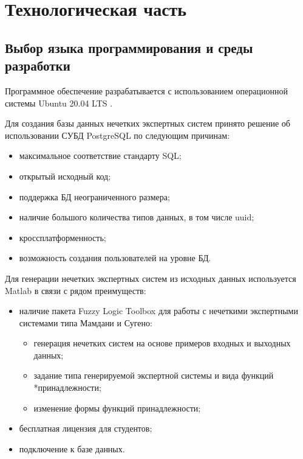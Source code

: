 
\section{Технологическая часть}

\subsection{Выбор языка программирования и среды разработки}
Программное обеспечение разрабатывается с использованием операционной системы Ubuntu 20.04 LTS \cite{ubuntu}.

Для создания базы данных нечетких экспертных систем принято решение об использовании СУБД PostgreSQL \cite{Postgres} по следующим причинам:
\begin{itemize}
	\item максимальное соответствие стандарту SQL;
	\item открытый исходный код;
	\item поддержка БД неограниченного размера;
	\item наличие большого количества типов данных, в том числе uuid;
	\item кроссплатформенность;
	\item возможность создания пользователей на уровне БД.
\end{itemize}

Для генерации нечетких экспертных систем из исходных данных используется Matlab \cite{matlab} в связи с рядом преимуществ:
\begin{itemize}
	\item наличие пакета Fuzzy Logic Toolbox для работы с нечеткими экспертными системами типа Мамдани и Сугено:
		\begin{itemize}
			\item генерация нечетких систем на основе примеров входных и выходных данных;
			\item задание типа генерируемой экспертной системы и вида функций \\*принадлежности;
			\item изменение формы функций принадлежности; 
		\end{itemize}
	\item бесплатная лицензия для студентов;
	\item подключение к базе данных.
\end{itemize}

